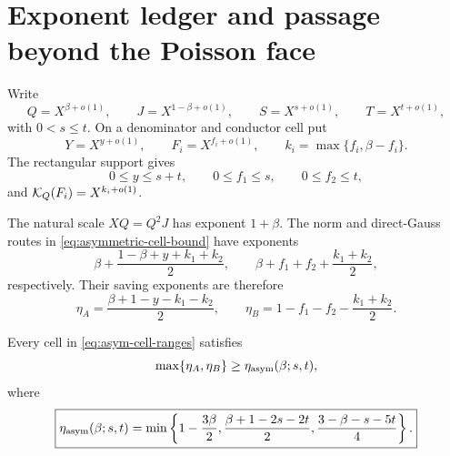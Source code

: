 \section{Exponent ledger and passage beyond the Poisson face}
\label{sec:exponent-passage}

Write
\begin{equation}
 Q=X^{\beta+o(1)},\qquad J=X^{1-\beta+o(1)},
 \qquad S=X^{s+o(1)},\qquad T=X^{t+o(1)},
 \label{eq:asym-exponent-main}
\end{equation}
with \(0<s\le t\).  On a denominator and conductor cell put
\begin{equation}
 Y=X^{y+o(1)},\qquad F_i=X^{f_i+o(1)},
 \qquad k_i=\max\{f_i,\beta-f_i\}.
 \label{eq:asym-cell-exponents}
\end{equation}
The rectangular support gives
\begin{equation}
 0\le y\le s+t,\qquad 0\le f_1\le s,\qquad 0\le f_2\le t,
 \label{eq:asym-cell-ranges}
\end{equation}
and \(\mathcal K_Q(F_i)=X^{k_i+o(1)}\).

The natural scale \(XQ=Q^2J\) has exponent \(1+\beta\).  The norm and
direct-Gauss routes in \eqref{eq:asymmetric-cell-bound} have exponents
\[
 \beta+\frac{1-\beta+y+k_1+k_2}{2},
 \qquad
 \beta+f_1+f_2+\frac{k_1+k_2}{2},
\]
respectively.  Their saving exponents are therefore
\begin{equation}
 \eta_A=\frac{\beta+1-y-k_1-k_2}{2},
 \qquad
 \eta_B=1-f_1-f_2-\frac{k_1+k_2}{2}.
 \label{eq:asym-etaAB}
\end{equation}

\begin{proposition}
\label{prop:asymmetric-ledger}
Every cell in \eqref{eq:asym-cell-ranges} satisfies
\begin{equation}
 \max\{\eta_A,\eta_B\}\ge
 \eta_{\rm asym}(\beta;s,t),
 \label{eq:asym-ledger-bound}
\end{equation}
where
\begin{equation}
 \boxed{
 \eta_{\rm asym}(\beta;s,t)
 =\min\left\{
 1-\frac{3\beta}{2},
 \frac{\beta+1-2s-2t}{2},
 \frac{3-\beta-s-5t}{4}
 \right\}.}
 \label{eq:eta-asymmetric}
\end{equation}
\end{proposition}

